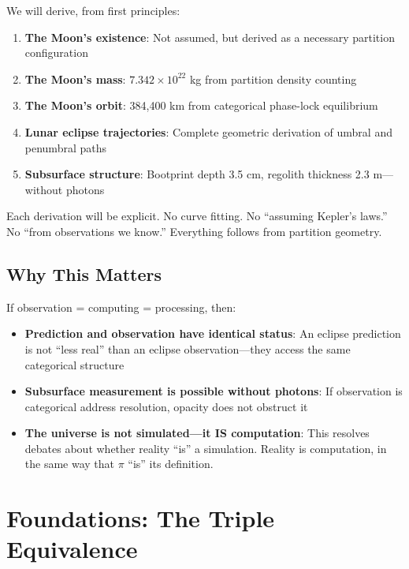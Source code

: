 \documentclass[twocolumn,10pt]{article}
\theoremstyle{definition}
\theoremstyle{remark}
\begin{document}
We will derive, from first principles:

\begin{enumerate}
    \item \textbf{The Moon's existence}: Not assumed, but derived as a necessary partition configuration
    \item \textbf{The Moon's mass}: $7.342 \times 10^{22}$ kg from partition density counting
    \item \textbf{The Moon's orbit}: 384,400 km from categorical phase-lock equilibrium
    \item \textbf{Lunar eclipse trajectories}: Complete geometric derivation of umbral and penumbral paths
    \item \textbf{Subsurface structure}: Bootprint depth 3.5 cm, regolith thickness 2.3 m---without photons
\end{enumerate}

Each derivation will be explicit. No curve fitting. No ``assuming Kepler's laws.'' No ``from observations we know.'' Everything follows from partition geometry.

\subsection{Why This Matters}

If observation = computing = processing, then:

\begin{itemize}
    \item \textbf{Prediction and observation have identical status}: An eclipse prediction is not ``less real'' than an eclipse observation---they access the same categorical structure
    \item \textbf{Subsurface measurement is possible without photons}: If observation is categorical address resolution, opacity does not obstruct it
    \item \textbf{The universe is not simulated---it IS computation}: This resolves debates about whether reality ``is'' a simulation. Reality is computation, in the same way that $\pi$ ``is'' its definition.
\end{itemize}

\section{Foundations: The Triple Equivalence}
\label{sec:foundations}
\end{document}

